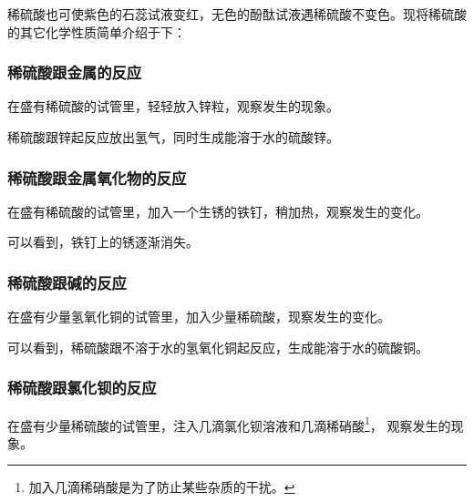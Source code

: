 稀硫酸也可使紫色的石蕊试液变红，无色的酚酞试液遇稀硫酸不变色。现将稀硫酸的其它化学性质简单介绍于下：

\subsubsection{稀硫酸跟金属的反应}

\begin{shiyan}
    在盛有稀硫酸的试管里，轻轻放入锌粒，观察发生的现象。
\end{shiyan}

稀硫酸跟锌起反应放出氢气，同时生成能溶于水的硫酸锌。
\begin{fangchengshi}
\end{fangchengshi}


\subsubsection{稀硫酸跟金属氧化物的反应}

\begin{shiyan}
    在盛有稀硫酸的试管里，加入一个生锈的铁钉，稍加热，观察发生的变化。
\end{shiyan}

可以看到，铁钉上的锈逐渐消失。
\begin{fangchengshi}
\end{fangchengshi}


\subsubsection{稀硫酸跟碱的反应}

\begin{shiyan}
    在盛有少量氢氧化铜的试管里，加入少量稀硫酸，现察发生的变化。
\end{shiyan}

可以看到，稀硫酸跟不溶于水的氢氧化铜起反应，生成能溶于水的硫酸铜。
\begin{fangchengshi}
\end{fangchengshi}


\subsubsection{稀硫酸跟氯化钡的反应}

\begin{shiyan}
    在盛有少量稀硫酸的试管里，注入几滴氯化钡溶液和几滴稀硝酸\footnote{加入几滴稀硝酸是为了防止某些杂质的干扰。}， 观察发生的现象。
\end{shiyan}

